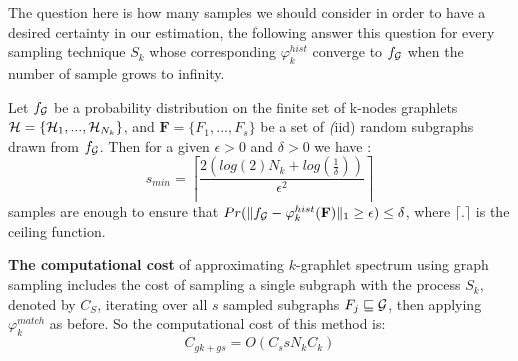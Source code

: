 The question here is how many samples we should consider in order to have a desired certainty in our estimation, the following answer this question for every sampling technique $S_k$ whose corresponding $\varphi_k^{hist}$ converge to $f_{\mathcal{G}}$ when the number of sample grows to infinity.
\begin{theorem}
Let $f_{\mathcal{G}}$ be a probability distribution on the finite set of k-nodes graphlets  $\mathcal{H}=\{\mathcal{H}_1,...,\mathcal{H}_{N_k}\}$, and $\mathbf{F}=\{F_1,...,F_{s}\}$ be a set of \emph(iid) random subgraphs drawn from $f_{\mathcal{G}}$. Then for a given $\epsilon>0$ and $\delta >0$ we have \citep{graphlet_kernel}:
\begin{equation}
s_{min}=\left \lceil \frac{2(log(2)N_k+log(\frac{1}{\delta} ))}{\epsilon^2} \right \rceil
\end{equation}
samples are enough to ensure that $Pr(\| f_{\mathcal{G}}-\varphi_k^{hist}(\mathbf{F}) \|_1 \geq \epsilon )\leq\delta$, where $\lceil.\rceil$ is the ceiling function.
\end{theorem}

\textbf{The computational cost} of approximating $k$-graphlet spectrum using graph sampling %
includes the cost of sampling a single subgraph with the process $S_k$, denoted by $C_S$, iterating over all $s$ sampled subgraphs $F_j\sqsubseteq \mathcal{G}$, then applying $\varphi^{match}_k$ as before. So the computational cost of this method is:
\begin{equation}
\label{eq:cost_graphlet_sampling}
    C_{gk + gs}= O(C_s s N_k C_k)
\end{equation}


